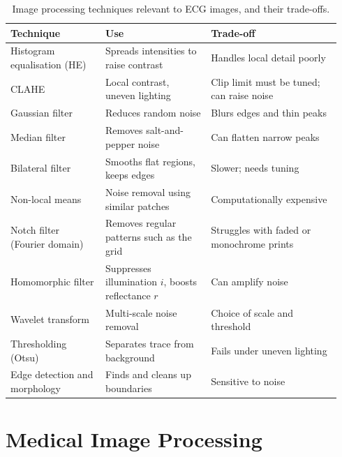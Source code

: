 \begin{table}[!htbp]
  \centering
  \footnotesize
  \renewcommand{\arraystretch}{1.15}
  \caption{Image processing techniques relevant to ECG images, and their trade-offs.}
  \label{tab:techniques}
  \begin{tabular}{@{}p{0.27\linewidth} p{0.30\linewidth} p{0.37\linewidth}@{}}
    \toprule
    \textbf{Technique} & \textbf{Use} & \textbf{Trade-off} \\
    \midrule
    Histogram equalisation (HE) & Spreads intensities to raise contrast & Handles local detail poorly \\
    CLAHE \cite{pizer_adaptive_1987,zuiderveld_contrast_1994} & Local contrast, uneven lighting & Clip limit must be tuned; can raise noise \\
    Gaussian filter \cite{gonzalez_digital_2018} & Reduces random noise & Blurs edges and thin peaks \\
    Median filter & Removes salt-and-pepper noise & Can flatten narrow peaks \\
    Bilateral filter \cite{tomasi_bilateral_1998,verma_ali_2013} & Smooths flat regions, keeps edges & Slower; needs tuning \\
    Non-local means \cite{buades_non-local_2005} & Noise removal using similar patches & Computationally expensive \\
    Notch filter (Fourier domain) \cite{gonzalez_digital_2018} & Removes regular patterns such as the grid & Struggles with faded or monochrome prints \\
    Homomorphic filter \cite{stockham_image_1972} & Suppresses illumination $i$, boosts reflectance $r$ & Can amplify noise \\
    Wavelet transform \cite{lepcha_deep_2023} & Multi-scale noise removal & Choice of scale and threshold \\
    Thresholding (Otsu) \cite{otsu_threshold_1979} & Separates trace from background & Fails under uneven lighting \\
    Edge detection \cite{canny_computational_1986} and morphology & Finds and cleans up boundaries & Sensitive to noise \\
    \bottomrule
  \end{tabular}
\end{table}

\section{Medical Image Processing}
\label{sec:medical-imaging}

